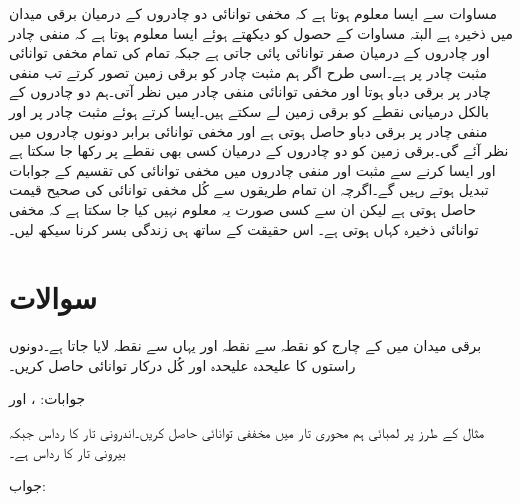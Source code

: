 مساوات  سے ایسا معلوم ہوتا ہے کہ مخفی توانائی دو چادروں کے درمیان برقی میدان میں ذخیرہ ہے البتہ مساوات  کے حصول کو دیکھتے ہوئے  ایسا معلوم ہوتا ہے کہ منفی چادر اور چادروں کے درمیان صفر توانائی پائی جاتی ہے جبکہ تمام کی تمام مخفی توانائی مثبت چادر پر ہے۔اسی طرح اگر ہم مثبت چادر کو برقی زمین تصور کرتے تب منفی چادر پر برقی دباو  ہوتا اور مخفی توانائی منفی چادر میں نظر آتی۔ہم دو چادروں کے بالکل درمیانی نقطے کو برقی زمین لے سکتے ہیں۔ایسا کرتے ہوئے مثبت چادر پر  اور منفی چادر پر  برقی دباو حاصل ہوتی ہے اور مخفی توانائی برابر دونوں چادروں میں نظر آئے گی۔برقی زمین کو دو چادروں کے درمیان کسی بھی نقطے پر رکھا جا سکتا ہے اور ایسا کرنے سے مثبت اور منفی چادروں میں مخفی توانائی کی تقسیم کے  جوابات تبدیل ہوتے رہیں گے۔اگرچہ ان تمام طریقوں سے کُل مخفی توانائی کی صحیح قیمت حاصل ہوتی ہے لیکن ان سے کسی صورت یہ معلوم نہیں کیا جا سکتا ہے کہ مخفی توانائی ذخیرہ کہاں ہوتی ہے۔ اس حقیقت کے ساتھ ہی زندگی بسر کرنا سیکھ لیں۔ 

\section*{سوالات}

برقی میدان  میں  کے چارج کو نقطہ  سے نقطہ  اور  یہاں سے نقطہ  لایا جاتا ہے۔دونوں راستوں کا علیحدہ علیحدہ اور کُل درکار توانائی حاصل کریں۔

جوابات: ،  اور 

مثال  کے طرز پر  لمبائی ہم محوری تار میں مخففی توانائی حاصل کریں۔اندرونی تار کا رداس  جبکہ بیرونی تار کا رداس  ہے۔

جواب:

